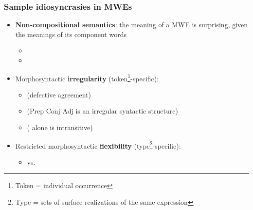 \documentclass[xcolor=dvipsnames]{beamer}
\begin{document}

\begin{frame}
  \frametitle{Sample idiosyncrasies in MWEs}

\begin{scriptsize}

\begin{block}{}%
   \begin{itemize}
   \item \textbf{Non-compositional semantics}: the meaning of a MWE is surprising, given the meanings of its component words
      \begin{itemize}
      \item[] 
      \item[] 
      \end{itemize}
   \item Morphosyntactic \textbf{irregularity} (token\footnote{{\scriptsize Token = individual occurrence}}-specific):
      \begin{itemize}
      \item[]  (defective agreement)
      \item[]  (Prep Conj Adj is an irregular syntactic structure)
      \item[]  ( alone is intransitive)
      \end{itemize}
   \item Restricted morphosyntactic \textbf{flexibility} (type\footnote{{\scriptsize Type = sets of surface realizations of the same expression}}-specific):
      \begin{itemize}
      \item[]  vs. 
      \end{itemize}
   \end{itemize}
\end{block}

\end{scriptsize}

\end{frame}
\end{document}

